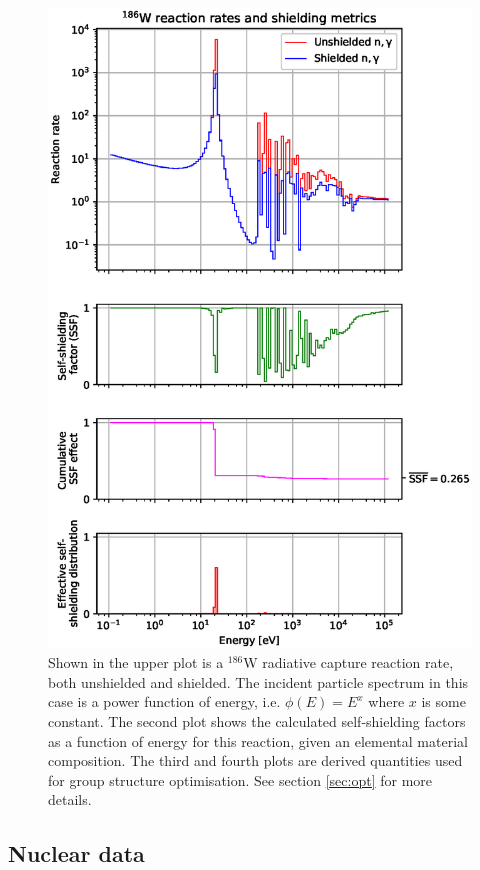 \begin{figure}[h]
\label{fig:w_cross_section}
\centering
\includegraphics[width=\linewidth]{W186_gamma.eps}
\caption{Shown in the upper plot is a $^{186}$W radiative capture reaction rate, both unshielded and shielded. The incident particle spectrum in this case is a power function of energy, i.e. $\phi(E) = E^{x}$ where $x$ is some constant. The second plot shows the calculated self-shielding factors as a function of energy for this reaction, given an elemental material composition. The third and fourth plots are derived quantities used for group structure optimisation. See section \ref{sec:opt} for more details.}
\end{figure}

\subsection{Nuclear data}


